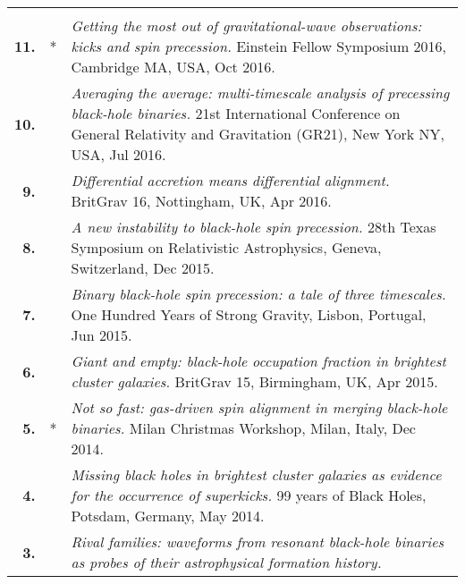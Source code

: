\documentclass[letterpaper]{moderncv}
\begin{document}
{\begin{longtable}{rp{0.4cm}p{15.8cm}}
\vspace{0.05cm}\\
%
\textbf{11.} & * & \textit{Getting the most out of gravitational-wave observations: kicks and spin precession.}
\newline{}Einstein Fellow Symposium 2016, Cambridge MA, USA, Oct 2016.
\vspace{0.05cm}\\
%
\textbf{10.} & & \textit{Averaging the average: multi-timescale analysis of precessing black-hole binaries.}
\newline{}21st International Conference on General Relativity and Gravitation (GR21), New York NY, USA, Jul 2016.
\vspace{0.05cm}\\
%
\textbf{9.} & & \textit{Differential accretion means differential alignment.}
\newline{}BritGrav 16, Nottingham, UK, Apr 2016.
\vspace{0.05cm}\\
%
\textbf{8.} & & \textit{A new instability to black-hole spin precession.}
\newline{}28th Texas Symposium on Relativistic Astrophysics, Geneva, Switzerland, Dec 2015.
\vspace{0.05cm}\\
%
\textbf{7.} & & \textit{Binary black-hole spin precession: a tale of three timescales.}
\newline{} 
One Hundred Years of Strong Gravity, Lisbon, Portugal, Jun 2015.
\vspace{0.05cm}\\
%
\textbf{6.} & & \textit{Giant and empty: black-hole occupation fraction in brightest cluster galaxies.}
\newline{} 
BritGrav 15, Birmingham, UK, Apr 2015.
\vspace{0.05cm}\\
%
\textbf{5.} & * & \textit{Not so fast: gas-driven spin alignment in merging black-hole binaries.}
\newline{} 
Milan Christmas Workshop, Milan, Italy, Dec 2014.
\vspace{0.05cm}\\
%
\textbf{4.} & & \textit{Missing black holes in brightest cluster galaxies as evidence for the occurrence of superkicks.}
\newline{} 
99 years of Black Holes, Potsdam, Germany, May 2014.
\vspace{0.05cm}\\
%
\textbf{3.} & & \textit{Rival families: waveforms from resonant black-hole binaries as probes of their astrophysical formation history.}

\end{longtable}}
\end{document}
